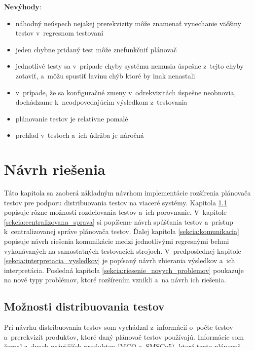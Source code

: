 \noindent \textbf{Nevýhody}:
\begin{itemize}
\item náhodný neúspech nejakej prerekvizity môže znamenať vynechanie väčšiny testov v~regresnom testovaní
\item jeden chybne pridaný test môže znefunkčniť plánovač
\item jednotlivé testy sa v~prípade chyby systému nemusia úspešne z~tejto chyby zotaviť, a~môžu spustiť lavínu chýb ktoré by inak nenastali 
\item v~prípade, že sa konfiguračné zmeny v~odrekvizitách úspešne neobnovia, dochádzame k~neodpovedajúcim výsledkom z~testovania
\item plánovanie testov je relatívne pomalé
\item prehľad v~testoch a~ich údržba je náročná
\end{itemize}


%
%
\chapter{Návrh riešenia}
\label{kapitola:navrh_riesenia}
Táto kapitola sa zaoberá základným návrhom implementácie rozšírenia plánovača testov pre podporu 
distribuovania testov na viaceré systémy. Kapitola \ref{sekcia:moznosti_distribuovania} popisuje rôzne
možnosti rozdeľovania testov a~ich porovnanie. V~kapitole \ref{sekcia:centralizovana_sprava}
si popíšeme návrh spúšťania testov a~prístup k~centralizovanej správe plánovača testov.
Ďalej kapitola \ref{sekcia:komunikacia} popisuje návrh riešenia komunikácie medzi jednotlivými
regresnými behmi vykonávaných na samostatných testovacích strojoch. V~predposlednej kapitole 
\ref{sekcia:interpretacia_vysledkov} je popísaný návrh zbierania výsledkov a~ich interpretácia.
Posledná kapitola \ref{sekcia:riesenie_novych_problemov} poukazuje na nové typy problémov,
ktoré rozšírením vznikli a~na návrh ich riešenia.



\section{Možnosti distribuovania testov}
\label{sekcia:moznosti_distribuovania}
Pri návrhu distribuovania testov som vychádzal z~informácií o~počte testov a~prerekvizít produktov,
ktoré daný plánovač testov používajú. Informácie som čerpal z~dvoch najväčších produktov (MCO a~SMSCv5), 
ktoré tento plánovač každodenne používajú. Pri každom regresnom behu, sa zbierajú štatistiky o~tom,
koľko testov bolo spustených, a~ako dlho každý test trval. 
V~tabuľkách \ref{tabulka:testy_mco} a~\ref{tabulka:testy_smscv5} sú zobrazené informácie o~testoch z~týchto dvoch najväčších produktov.

